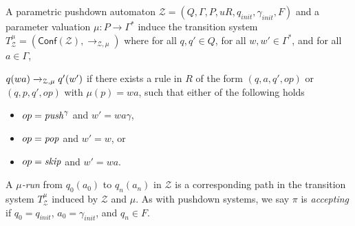 \documentclass[a4paper,UKenglish,cleveref, autoref, thm-restate]{lipics-v2021}
\newcommand{\Conf}{\mathsf{Conf}}
\begin{document}
\begin{samepage}
A parametric pushdown automaton  $\mathcal{Z}= (Q, \Gamma, P,u R, q_{init}, \gamma_{init},F)$ 
and a parameter valuation $\mu: P\rightarrow \Gamma^*$ induce the 
transition system  
$T_{\mathcal{Z}}^{\mu} = (\Conf(\mathcal{Z}), 
\rightarrow_{\mathcal{Z},\mu})$ where
for all $ q, q'  \in  Q$, 
for all $ w,w' \in \Gamma^* $, and 
for all $ a  \in  \Gamma$, 

$q(wa) \xrightarrow{%
}_{\mathcal{Z},\mu} q'(w')$
if there exists a rule in $R$
 of the form $(q,a,q', op)$ or $(q,p,q', op)$ with $\mu(p)=wa$,
such that
either of the following holds
\begin{itemize}
\item $ op = \text{\textit{push}}^\gamma$ and $w' = wa\gamma$,

\item $ op = \text{\textit{pop}}$ and $w' = w$, or

\item $ op = \text{\textit{skip}}$ and $w' = wa$.
\end{itemize}
\end{samepage}


A {\em $\mu$-run} from $q_0(a_0)$ to $q_n(a_n)$ in $\mathcal{Z}$ is a corresponding
path in the transition system 
$T_{\mathcal{Z}}^\mu$ 
induced by $\mathcal{Z}$ and $\mu$.
%
%
As with pushdown systems, we say $\pi$ is {\em accepting} if $q_0 = q_{init}$, $a_0=\gamma_{init}$,
and $q_n\in F$.
%
\end{document}
